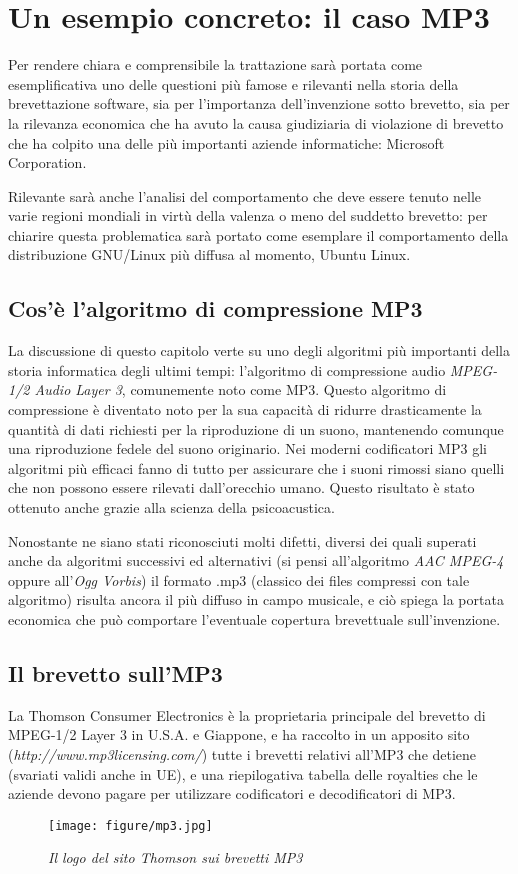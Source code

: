 \chapter{Un esempio concreto: il caso MP3}
Per rendere chiara e comprensibile la trattazione sarà portata come esemplificativa uno delle questioni più famose e rilevanti nella storia della brevettazione software, sia per l'importanza dell'invenzione sotto brevetto, sia per la rilevanza economica che ha avuto la causa giudiziaria di violazione di brevetto che ha colpito una delle più importanti aziende informatiche: Microsoft Corporation.

Rilevante sarà anche l'analisi del comportamento che deve essere tenuto nelle varie regioni mondiali in virtù della valenza o meno del suddetto brevetto: per chiarire questa problematica sarà portato come esemplare il comportamento della distribuzione GNU/Linux più diffusa al momento, Ubuntu Linux\cite{ubuntu}.

\section{Cos'è l'algoritmo di compressione MP3}
La discussione di questo capitolo verte su uno degli algoritmi più importanti della storia informatica degli ultimi tempi: l'algoritmo di compressione audio \textit{MPEG-1/2 Audio Layer 3}, comunemente noto come MP3. Questo algoritmo di compressione è diventato noto per la sua capacità di ridurre drasticamente la quantità di dati richiesti per la riproduzione di un suono, mantenendo comunque una riproduzione fedele del suono originario. Nei moderni codificatori MP3 gli algoritmi più efficaci fanno di tutto per assicurare che i suoni rimossi siano quelli che non possono essere rilevati dall'orecchio umano. Questo risultato è stato ottenuto anche grazie alla scienza della psicoacustica.

Nonostante ne siano stati riconosciuti molti difetti, diversi dei quali superati anche da algoritmi successivi ed alternativi (si pensi all'algoritmo \textit{AAC MPEG-4} oppure all'\textit{Ogg Vorbis}) il formato .mp3 (classico dei files compressi con tale algoritmo) risulta ancora il più diffuso in campo musicale, e ciò spiega la portata economica che può comportare l'eventuale copertura brevettuale sull'invenzione.
\section{Il brevetto sull'MP3}\label{mp3-patent}
La Thomson Consumer Electronics è la proprietaria principale del brevetto di MPEG-1/2 Layer 3 in U.S.A. e Giappone, e ha raccolto in un apposito sito (\textit{http://www.mp3licensing.com/}) tutte i brevetti relativi all'MP3 che detiene (svariati validi anche in UE), e una riepilogativa tabella delle royalties che le aziende devono pagare per utilizzare codificatori e decodificatori di MP3.
\begin{figure}[b]
	\begin{center}
		\texttt{[image: figure/mp3.jpg]}
	\end{center}
	\caption{\textit{Il logo del sito Thomson sui brevetti MP3}}
\end{figure}
